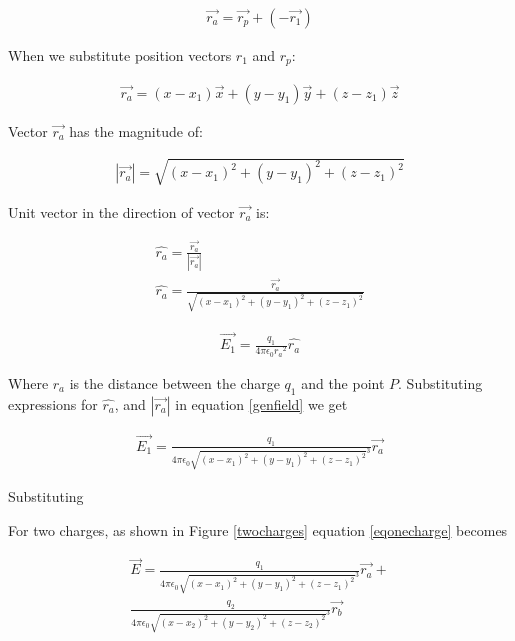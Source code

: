 \documentclass{ximera}
\begin{document}
\begin{eqnarray}
\vec{r_a}=\vec{r_p} + (-\vec{r_1})
\end{eqnarray}

When we substitute position vectors $r_1$ and $r_p$:

\begin{eqnarray}
\vec{r_a}= (x - x_1) \vec{x} +(y - y_1) \vec{y} +(z - z_1) \vec{z}
\end{eqnarray}

Vector $\vec{r_a}$ has the magnitude of:


\begin{eqnarray}
|\vec{r_a}|= \sqrt{(x - x_1)^2 +(y - y_1)^2 +(z - z_1)^2}
\end{eqnarray}

Unit vector in the direction of vector $\vec{r_a}$ is:


\begin{eqnarray}
\hat{r_a}= \frac{\vec{r_a}}{|\vec{r_a}|} \\
\hat{r_a}=\frac{\vec{r_a}}{\sqrt{(x - x_1)^2 +(y - y_1)^2 +(z - z_1)^2}}
\end{eqnarray}



\begin{eqnarray}
\vec{E_1}=\frac{q_1}{4 \pi \epsilon_{0} {r_a}^2} \hat{r_a}
\end{eqnarray}

Where $r_a$ is the distance between the charge $q_1$ and the point $P$. Substituting expressions for $\hat{r_a}$, and $|\vec{r_a}|$ in equation \ref{genfield} we get

 



\begin{eqnarray}
\vec{E_1}=\frac{q_1}{4 \pi \epsilon_{0} {\sqrt{(x - x_1)^2 +(y - y_1)^2 +(z - z_1)^2}
}^3} \vec{r_a} \label{eqonecharge}
\end{eqnarray}

Substituting 


For two charges, as shown in Figure \ref{twocharges} equation \ref{eqonecharge} becomes

\begin{eqnarray}
\vec{E}= \frac{q_1}{4 \pi \epsilon_{0} {\sqrt{(x - x_1)^2 +(y - y_1)^2 +(z - z_1)^2}
}^3} \vec{r_a} + \nonumber \\ \frac{q_2}{4 \pi \epsilon_{0} {\sqrt{(x - x_2)^2 +(y - y_2)^2 +(z - z_2)^2}
}^3} \vec{r_b} 
\end{eqnarray}
\end{document}
